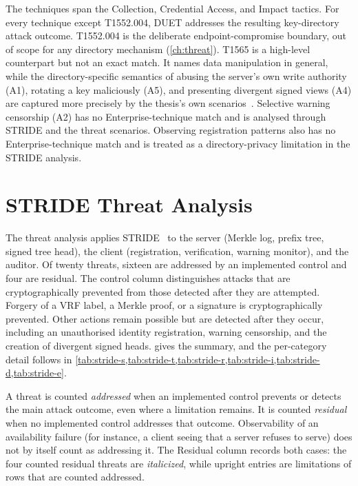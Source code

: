 The techniques span the Collection, Credential Access, and Impact tactics. For every technique
except T1552.004, DUET addresses the resulting key-directory attack outcome. T1552.004 is the deliberate
endpoint-compromise boundary, out of scope for any directory mechanism (\cref{ch:threat}). T1565 is a
high-level counterpart but not an exact match. It names data manipulation in general,
while the directory-specific semantics of abusing the server's own write authority (A1), rotating a
key maliciously (A5), and presenting divergent signed views (A4) are captured more precisely by the
thesis's own scenarios~\cite{mitre-attack}. Selective warning censorship (A2) has no
Enterprise-technique match and is analysed through STRIDE and the threat scenarios. Observing
registration patterns also has no Enterprise-technique match and is treated as a directory-privacy
limitation in the STRIDE analysis.

\section{STRIDE Threat Analysis}\label{sec:sec-stride}

The threat analysis applies STRIDE~\cite{stride} to the server (Merkle log, prefix tree, signed
tree head), the client (registration, verification, warning monitor), and the auditor. Of twenty threats, sixteen are
addressed by an implemented control and four are residual. The control column distinguishes attacks
that are cryptographically prevented from those detected after they are attempted. Forgery of a VRF
label, a Merkle proof, or a signature is cryptographically prevented. Other
actions remain possible but are detected after they occur, including an unauthorised identity
registration, warning censorship, and the creation of divergent signed heads.
 gives the summary, and
the per-category detail follows in \cref{tab:stride-s,tab:stride-t,tab:stride-r,tab:stride-i,tab:stride-d,tab:stride-e}.

A threat is counted \emph{addressed} when an implemented control prevents or detects the main
attack outcome, even where a limitation remains. It is counted \emph{residual} when no implemented
control addresses that outcome. Observability of an availability failure (for instance, a client
seeing that a server refuses to serve) does not by itself count as addressing it. The Residual column
records both cases: the four counted residual threats are \emph{italicized}, while upright entries
are limitations of rows that are counted addressed.

